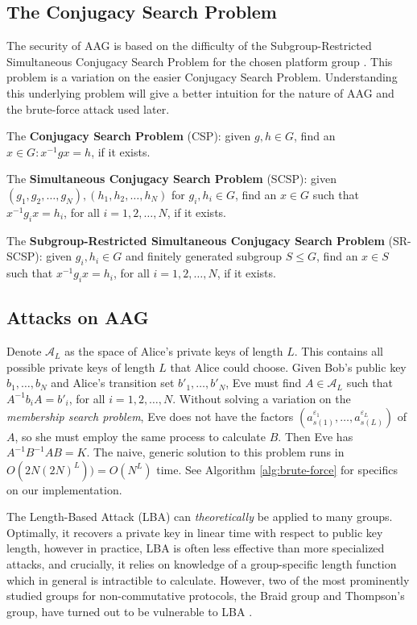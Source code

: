 
\subsection{The Conjugacy Search Problem}

The security of AAG is based on the difficulty of the Subgroup-Restricted Simultaneous Conjugacy Search Problem for the chosen platform group \cite{csp_insufficient}. This problem is a variation on the easier Conjugacy Search Problem. Understanding this underlying problem will give a better intuition for the nature of AAG and the brute-force attack used later.

The \textbf{Conjugacy Search Problem} (CSP): given $g, h \in G$, find an $x \in G : x^{-1}gx = h$, if it exists.

The \textbf{Simultaneous Conjugacy Search Problem} (SCSP): given $(g_1, g_2, \dots, g_N), (h_1, h_2, \dots, h_N)$ for $g_i, h_i \in G$, find an $x \in G$ such that $x^{-1} g_i x = h_i$, for all $i=1, 2, \dots, N$, if it exists.

The \textbf{Subgroup-Restricted Simultaneous Conjugacy Search Problem} (SR-SCSP): given $g_i, h_i \in G$ and finitely generated subgroup $S \leq G$, find an $x \in S$ such that $x^{-1} g_i x = h_i$, for all $i=1, 2, \dots, N$, if it exists.

\subsection{Attacks on AAG}\label{sec:attacks-on-aag}

Denote $\mathcal{A}_L$ as the space of Alice's private keys of length $L$. This contains all possible private keys of length $L$ that Alice could choose. Given Bob's public key $b_1, \dots, b_N$ and Alice's transition set $b'_1, \dots, b'_N$, Eve must find $A \in \mathcal{A}_L$ such that $A^{-1} b_i A = b'_i$, for all $i=1, 2, \dots, N$. Without solving a variation on the \textit{membership search problem}, Eve does not have the factors $(a_{s(1)}^{\varepsilon_1}, \ldots, a_{s(L)}^{\varepsilon_L})$ of $A$, so she must employ the same process to calculate $B$. Then Eve has $A^{-1}B^{-1}AB = K$. The naive, generic solution to this problem runs in $O(2N(2N)^L)) = O(N^L)$ time. See Algorithm \ref{alg:brute-force} for specifics on our implementation.

The Length-Based Attack (LBA) \cite{lba} can \textit{theoretically} be applied to many groups. Optimally, it recovers a private key in linear time with respect to public key length, however in practice, LBA is often less effective than more specialized attacks, and crucially, it relies on knowledge of a group-specific length function which in general is intractible to calculate. However, two of the most prominently studied groups for non-commutative protocols, the Braid group and Thompson's group, have turned out to be vulnerable to LBA . 

